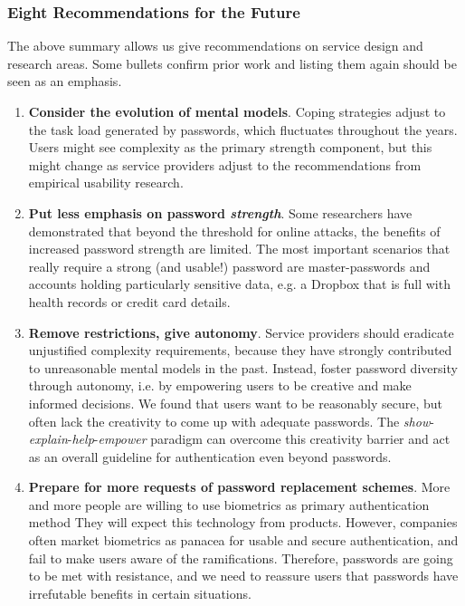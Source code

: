 \subsubsection{Eight Recommendations for the Future}\label{sec:summary:recommendations}
The above summary allows us give recommendations on service design and research areas. Some bullets confirm prior work and listing them again should be seen as an emphasis. 
\begin{enumerate}
	\item \textbf{Consider the evolution of mental models}. Coping strategies adjust to the task load generated by passwords, which fluctuates throughout the years. Users might see complexity as the primary strength component, but this might change as service providers adjust to the recommendations from empirical usability research. 
	
	\item \textbf{Put less emphasis on password \textit{strength}}. Some researchers have demonstrated that beyond the threshold for online attacks, the benefits of increased password strength are limited. The most important scenarios that really require a strong (and usable!) password are master-passwords and accounts holding particularly sensitive data, e.g. a Dropbox that is full with health records or credit card details. 
	
	\item \textbf{Remove restrictions, give autonomy}. Service providers should eradicate unjustified complexity requirements, because they have strongly contributed to unreasonable mental models in the past. Instead, foster password diversity through autonomy, i.e. by empowering users to be creative and make informed decisions. We found that users want to be reasonably secure, but often lack the creativity to come up with adequate passwords.
	The \textit{show}-\textit{explain}-\textit{help}-\textit{empower} paradigm can overcome this creativity barrier and act as an overall guideline for authentication even beyond passwords.
	
	\item \textbf{Prepare for more requests of password replacement schemes}. More and more people are willing to use biometrics as primary authentication method%
	They will expect this technology from products. However, companies often market biometrics as panacea for usable and secure authentication, and fail to make users aware of the ramifications. Therefore, passwords are going to be met with resistance, and we need to reassure users that passwords have irrefutable benefits in certain situations. 
		

\end{enumerate}
